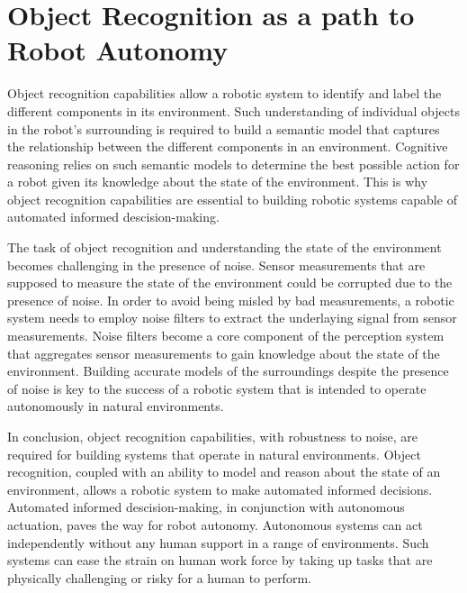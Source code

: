 \section{Object Recognition as a path to Robot Autonomy}

Object recognition capabilities allow a robotic system to identify and label the different components in its environment. Such understanding of individual objects in the robot's surrounding is required to build a semantic model that captures the relationship between the different components in an environment.
Cognitive reasoning relies on such semantic models to determine the best possible action for a robot given its knowledge about the state of the environment. This is why object recognition capabilities are essential to building robotic systems capable of automated informed descision-making.

The task of object recognition and understanding the state of the environment becomes challenging in the presence of noise. Sensor measurements
that are supposed to measure the state of the environment could be corrupted due to the presence of noise. In order to avoid being misled by bad measurements,
a robotic system needs to employ noise filters to extract the underlaying signal from sensor measurements. Noise filters become a core component of the perception system that aggregates sensor measurements to gain knowledge about the state of the environment. Building accurate models of the surroundings despite the presence of noise is key to the success of a robotic system that is intended to operate autonomously in natural environments.

In conclusion, object recognition capabilities, with robustness to noise, are required for building systems that operate in natural environments. Object recognition, coupled with an ability to model and reason about the state of an environment, allows a robotic system to make automated informed decisions. Automated informed descision-making, in conjunction with autonomous actuation, paves the way for robot autonomy. Autonomous systems can act independently without any human support in a range of environments. Such systems can ease the strain on human work force by taking up tasks that are physically challenging or risky for a human to perform.

